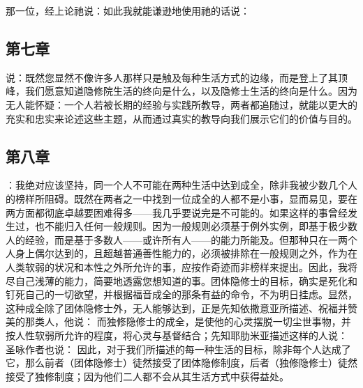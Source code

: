 那一位，经上论祂说：如此我就能谦逊地使用祂的话说：\par


\subsection{第七章}

\par

说：既然您显然不像许多人那样只是触及每种生活方式的边缘，而是登上了其顶峰，我们愿意知道隐修院生活的终向是什么，以及隐修士生活的终向是什么。因为无人能怀疑：一个人若被长期的经验与实践所教导，两者都追随过，就能以更大的充实和忠实来论述这些主题，从而通过真实的教导向我们展示它们的价值与目的。\par


\subsection{第八章}

\par

：我绝对应该坚持，同一个人不可能在两种生活中达到成全，除非我被少数几个人的榜样所阻碍。既然在两者之一中找到一位成全的人都不是小事，显而易见，要在两方面都彻底卓越要困难得多——我几乎要说完是不可能的。如果这样的事曾经发生过，也不能归入任何一般规则。因为一般规则必须基于例外实例，即基于极少数人的经验，而是基于多数人——或许所有人——的能力所能及。但那种只在一两个人身上偶尔达到的，且超越普通善性能力的，必须被排除在一般规则之外，作为在人类软弱的状况和本性之外所允许的事，应按作奇迹而非榜样来提出。因此，我将尽自己浅薄的能力，简要地透露您想知道的事。团体隐修士的目标，确实是死化和钉死自己的一切欲望，并根据福音成全的那条有益的命令，不为明日挂虑。显然，这种成全除了团体隐修士外，无人能够达到，正是先知依撒意亚所描述、祝福并赞美的那类人，他说：  而独修隐修士的成全，是使他的心灵摆脱一切尘世事物，并按人性软弱所允许的程度，将心灵与基督结合；先知耶肋米亚描述这样的人说： 圣咏作者也说： 因此，对于我们所描述的每一种生活的目标，除非每个人达成了它，那么前者（团体隐修士）徒然接受了团体隐修制度，后者（独修隐修士）徒然接受了独修制度；因为他们二人都不会从其生活方式中获得益处。\par

